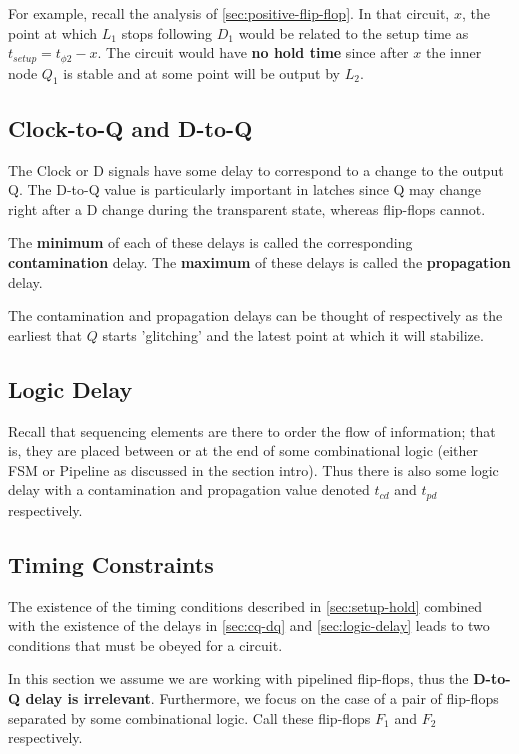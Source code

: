 \documentclass[11pt]{report}
\begin{document}
For example, recall the analysis of \autoref{sec:positive-flip-flop}. In that circuit, $x$, the point at which $L_1$ stops following $D_1$ would be related to the setup time as $t_{setup} = t_{\phi2} - x$. The circuit would have \textbf{no hold time} since after $x$ the inner node $Q_1$ is stable and at some point will be output by $L_2$.

\subsection{Clock-to-Q and D-to-Q}\label{sec:cq-dq}
The Clock or D signals have some delay to correspond to a change to the output Q. The D-to-Q value is particularly important in latches since Q may change right after a D change during the transparent state, whereas flip-flops cannot.

The \textbf{minimum} of each of these delays is called the corresponding \textbf{contamination} delay. The \textbf{maximum} of these delays is called the \textbf{propagation} delay.

The contamination and propagation delays can be thought of respectively as the earliest that $Q$ starts 'glitching' and the latest point at which it will stabilize.

\subsection{Logic Delay}\label{sec:logic-delay}
Recall that sequencing elements are there to order the flow of information; that is, they are placed between or at the end of some combinational logic (either FSM or Pipeline as discussed in the section intro). Thus there is also some logic delay with a contamination and propagation value denoted $t_{cd}$ and $t_{pd}$ respectively.

\subsection{Timing Constraints}\label{sec:timing-constraints}
The existence of the timing conditions described in \autoref{sec:setup-hold} combined with the existence of the delays in \autoref{sec:cq-dq} and \autoref{sec:logic-delay} leads to two conditions that must be obeyed for a circuit.

In this section we assume we are working with pipelined flip-flops, thus the \textbf{D-to-Q delay is irrelevant}. Furthermore, we focus on the case of a pair of flip-flops separated by some combinational logic. Call these flip-flops $F_1$ and $F_2$ respectively.
\end{document}
